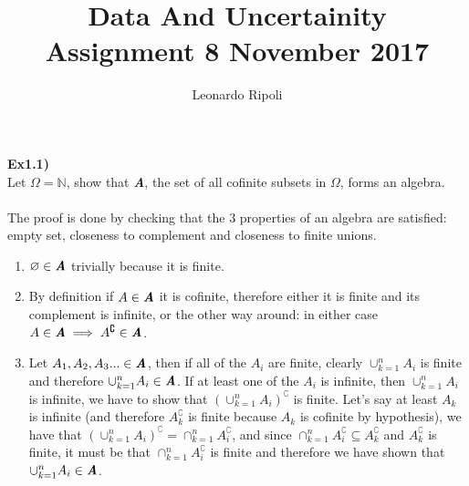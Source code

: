 \documentclass[12pt,mythesisstyle]{report}
\title{Data And Uncertainity\\Assignment 8 November 2017}
\author{Leonardo Ripoli}
\date{}
\begin{document}
\begin{titlepage}
\maketitle
\end{titlepage}
\textbf{Ex1.1)}\\
Let \(\Omega=\mathbb{N}\), show that \textbf{\textit{A}}, the set of all cofinite subsets in \(\Omega\), forms an algebra.
\\
\\The proof is done by checking that the 3 properties of an algebra are satisfied: empty set, closeness to complement and closeness to finite unions.
\\
\begin{enumerate}
\item \(\varnothing\in\textbf{\textit{A}}\) trivially because it is finite.\\
\item By definition if \(A\in\textbf{\textit{A}}\) it is cofinite, therefore either it is finite and its complement is infinite, or the other way around: in either case \(A\in\textbf{\textit{A}}\implies A^\complement\in\textbf{\textit{A}}\).\\
\item Let \(A_1, A_2, A_3...\in\textbf{\textit{A}}\), then if all of the \(A_i\) are finite, clearly \(\cup_{k=1}^nA_i\) is finite and therefore \(\cup_{k=1}^nA_i\in\textbf{\textit{A}}\). If at least one of the \(A_i\) is infinite, then \(\cup_{k=1}^nA_i\) is infinite, we have to show that \((\cup_{k=1}^nA_i)^\complement\) is finite. Let's say at least \(A_k\) is infinite (and therefore \(A_k^\complement\) is finite because \(A_k\) is cofinite by hypothesis), we have that \((\cup_{k=1}^nA_i)^\complement=\cap_{k=1}^nA_i^\complement\), and since \(\cap_{k=1}^nA_i^\complement\subseteq A_k^\complement\) and \(A_k^\complement\) is finite, it must be that \(\cap_{k=1}^nA_i^\complement\) is finite and therefore we have shown that \(\cup_{k=1}^nA_i\in\textbf{\textit{A}}\).
\end{enumerate}
\end{document}
